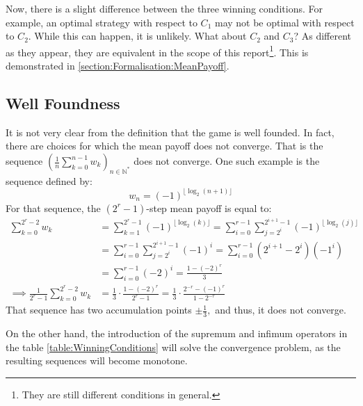 Now, there is a slight difference between the three winning conditions.
\newline For example, an optimal strategy with respect to $C_1$ may not be optimal with respect to $C_2$. While this can happen, it is unlikely.
\newline What about $C_2$ and $C_3$? As different as they appear, they are equivalent in the scope of this report\footnote{They are still different conditions in general.}.
This is demonstrated in \ref{section:Formalisation:MeanPayoff}.
\subsection{Well Foundness}
It is not very clear from the definition that the game is well founded. \newline
In fact, there are choices for which the mean payoff does not converge. That is the sequence $\left(\frac{1}{n}\sum_{k=0}^{n-1} w_k \right)_{n\in\mathbb{N}^*}$ does not converge. \newline One such example is the sequence defined by:
$$
w_n=(-1)^{\lfloor  \log_2 (n+1)\rfloor}
$$
For that sequence, the $(2^r-1)$-step mean payoff is equal to:
\begin{align*}
	\sum_{k=0}^{2^r-2} w_k &= 	\sum_{k=1}^{2^r-1}(-1)^{\lfloor  \log_2 (k)\rfloor} = \sum_{i=0}^{r-1}\sum_{j=2^{i}}^{2^{i+1}-1}(-1)^{\lfloor  \log_2 (j)\rfloor} \\
	&=\sum_{i=0}^{r-1}\sum_{j=2^{i}}^{2^{i+1}-1}(-1)^i =\sum_{i=0}^{r-1}(2^{i+1}-2^i)(-1^i) \\
	&=\sum_{i=0}^{r-1}(-2)^i = \frac{1-(-2)^r}{3} \\
	\implies \frac{1}{2^r-1}\sum_{k=0}^{2^r-2} w_k  &= \frac{1}{3} \cdot \frac{1-(-2)^r}{2^r-1} = \frac{1}{3} \cdot \frac{2^{-r}-(-1)^r}{1-2^{-r}}
\end{align*}
That sequence has two accumulation points $\pm \frac{1}{3},$ and thus, it does not converge.

On the other hand, the introduction of the supremum and infimum operators in the table \ref{table:WinningConditions} will solve the convergence problem, as the resulting sequences will become monotone.

